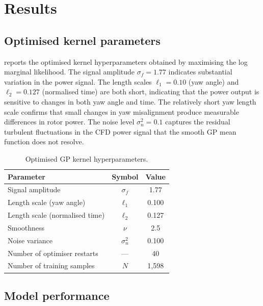 \documentclass[12pt]{article}
\begin{document}
\section{Results}
\label{sec:results}

\subsection{Optimised kernel parameters}

 reports the optimised kernel hyperparameters obtained by maximising the log marginal likelihood.
The signal amplitude $\sigma_f = 1.77$ indicates substantial variation in the power signal.
The length scales $\ell_1 = 0.10$ (yaw angle) and $\ell_2 = 0.127$ (normalised time) are both short, indicating that the power output is sensitive to changes in both yaw angle and time.
The relatively short yaw length scale confirms that small changes in yaw misalignment produce measurable differences in rotor power.
The noise level $\sigma_n^2 = 0.1$ captures the residual turbulent fluctuations in the CFD power signal that the smooth GP mean function does not resolve.

\begin{table}[t]
\centering
\caption{Optimised GP kernel hyperparameters.}
\label{tab:kernel_params}
\begin{tabular}{lcc}
\toprule
\textbf{Parameter} & \textbf{Symbol} & \textbf{Value} \\
\midrule
Signal amplitude & $\sigma_f$ & 1.77 \\
Length scale (yaw angle) & $\ell_1$ & 0.100 \\
Length scale (normalised time) & $\ell_2$ & 0.127 \\
Smoothness & $\nu$ & 2.5 \\
Noise variance & $\sigma_n^2$ & 0.100 \\
\midrule
Number of optimiser restarts & --- & 40 \\
Number of training samples & $N$ & 1{,}598 \\
\bottomrule
\end{tabular}
\end{table}

\subsection{Model performance}
\end{document}
